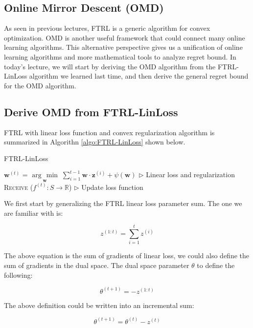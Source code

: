 \documentclass[11pt]{article}
\newcommand{\argmin}[1]{\underset{#1}{\operatorname{arg}\,\operatorname{min}}\;}
\begin{document}
\subsection{Online Mirror Descent (OMD)}
As seen in previous lectures, FTRL is a generic algorithm for convex optimization. OMD is another useful framework that could connect many online learning algorithms. This alternative perspective gives us a unification of online learning algorithms and more mathematical tools to analyze regret bound. In today's lecture, we will start by deriving the OMD algorithm from the FTRL-LinLoss algorithm we learned last time, and then derive the general regret bound for the OMD algorithm.

\subsection{Derive OMD from FTRL-LinLoss}
FTRL with linear loss function and convex regularization algorithm is summarized in Algorithn \ref{algo:FTRL-LinLoss} shown below.

\begin{algorithm}[H]
\caption{FTRL-LinLoss}
\label{algo:FTRL-LinLoss}
\begin{algorithmic}[1]
    \STATE $\bm{w}^{(t)}$ = $\argmin{\bm{w}} \sum^{t-1}_{i=1} \bm{w}\cdot\bm{z}^{(i)} + \psi (\bm{w})$ \hfill $\triangleright$ Linear loss and regularization
    \STATE \textsc{Receive} ($f^{(t)} : S \rightarrow \mathbb{R}$) \hfill $\triangleright$ Update loss function
\ENDFOR
\end{algorithmic}
\end{algorithm}


We first start by generalizing the FTRL linear loss parameter sum. The one we are familiar with is:

\begin{equation*}
    z^{(1:t)} = \sum^t_{i=1}z^{(i)}
\end{equation*}

The above equation is the sum of gradients of linear loss, we could also define the sum of gradients in the dual space. The dual space parameter $\theta$ to define the following:

\begin{equation*}
    \theta^{(t+1)} = -z^{(1:t)}
\end{equation*}

The above definition could be written into an incremental sum:

\begin{equation*}
    \theta^{(t+1)} = \theta^{(t)} - z^{(t)}
\end{equation*}
\end{document}
